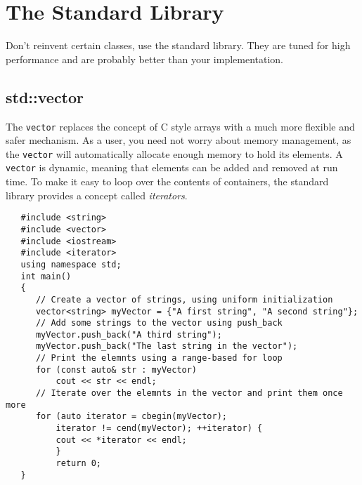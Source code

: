 \documentclass{article}
\begin{document}
\section{The Standard Library}
Don't reinvent certain classes, use the standard library. They are tuned for high performance and are
probably better than your implementation.
\subsection{std::vector}
The \texttt{vector} replaces the concept of C style arrays with a much more flexible and safer
mechanism. As a user, you need not worry about memory management, as the \texttt{vector} will
automatically allocate enough memory to hold its elements. A \texttt{vector} is dynamic, meaning
that elements can be added and removed at run time. To make it easy to loop over the contents
of containers, the standard library provides a concept called \textit{iterators}.
\begin{verbatim}
   #include <string>
   #include <vector>
   #include <iostream>
   #include <iterator>
   using namespace std;
   int main() 
   {
      // Create a vector of strings, using uniform initialization
      vector<string> myVector = {"A first string", "A second string"};
      // Add some strings to the vector using push_back
      myVector.push_back("A third string");
      myVector.push_back("The last string in the vector");
      // Print the elemnts using a range-based for loop
      for (const auto& str : myVector)
          cout << str << endl;
      // Iterate over the elemnts in the vector and print them once more
      for (auto iterator = cbegin(myVector);
          iterator != cend(myVector); ++iterator) {
          cout << *iterator << endl;
          }
          return 0;
   }
\end{verbatim}
\end{document}
